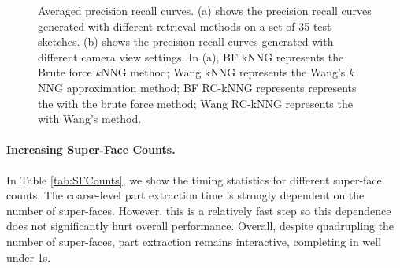 \begin{figure}\centering
{}
\caption{Averaged precision recall curves. (a) shows the precision recall curves generated with different retrieval methods on a set of 35 test sketches.
(b) shows the precision recall curves generated with different camera view settings.
In (a), BF kNNG represents the Brute force $k$NNG method; Wang kNNG represents the Wang's $k$NNG approximation method;
BF RC-kNNG represents represents the {\RCKNNG} with the brute force method;
Wang RC-kNNG represents the {\RCKNNG} with Wang's method.}\label{fig:PreRecCurve}
\end{figure}

\paragraph*{Increasing Super-Face Counts.} In Table \ref{tab:SFCounts}, we show the timing statistics for different super-face counts. The coarse-level part extraction time is strongly dependent on the number of super-faces. However, this is a relatively fast step so this dependence does not significantly hurt overall performance. Overall, despite quadrupling the number of super-faces, part extraction remains interactive, completing in well under 1s.

